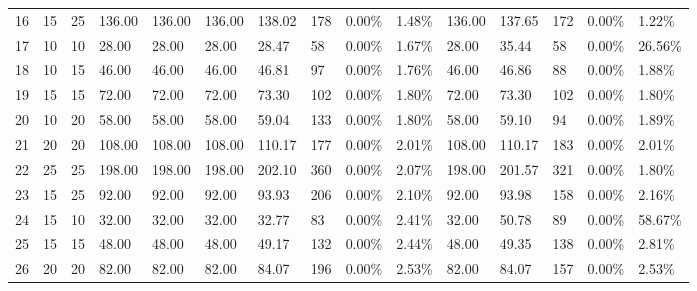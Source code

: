 \documentclass[
  a4paper,
,tablecaptionabove
]{scrartcl}
\numberwithin{equation}{section}
\begin{document}
\begin{longtable}{l|ll|ll|lllll|lllll}
  16 & 15                         & 25                         & 136.00                    & 136.00      & 136.00        & 138.02 & 178 & 0.00\%  & 1.48\% & 136.00 & 137.65 & 172 & 0.00\%  & 1.22\%  \\
  17 & 10                         & 10                         & 28.00                     & 28.00       & 28.00         & 28.47  & 58  & 0.00\%  & 1.67\% & 28.00  & 35.44  & 58  & 0.00\%  & 26.56\% \\
  18 & 10                         & 15                         & 46.00                     & 46.00       & 46.00         & 46.81  & 97  & 0.00\%  & 1.76\% & 46.00  & 46.86  & 88  & 0.00\%  & 1.88\%  \\
  19 & 15                         & 15                         & 72.00                     & 72.00       & 72.00         & 73.30  & 102 & 0.00\%  & 1.80\% & 72.00  & 73.30  & 102 & 0.00\%  & 1.80\%  \\
  20 & 10                         & 20                         & 58.00                     & 58.00       & 58.00         & 59.04  & 133 & 0.00\%  & 1.80\% & 58.00  & 59.10  & 94  & 0.00\%  & 1.89\%  \\
  21 & 20                         & 20                         & 108.00                    & 108.00      & 108.00        & 110.17 & 177 & 0.00\%  & 2.01\% & 108.00 & 110.17 & 183 & 0.00\%  & 2.01\%  \\
  22 & 25                         & 25                         & 198.00                    & 198.00      & 198.00        & 202.10 & 360 & 0.00\%  & 2.07\% & 198.00 & 201.57 & 321 & 0.00\%  & 1.80\%  \\
  23 & 15                         & 25                         & 92.00                     & 92.00       & 92.00         & 93.93  & 206 & 0.00\%  & 2.10\% & 92.00  & 93.98  & 158 & 0.00\%  & 2.16\%  \\
  24 & 15                         & 10                         & 32.00                     & 32.00       & 32.00         & 32.77  & 83  & 0.00\%  & 2.41\% & 32.00  & 50.78  & 89  & 0.00\%  & 58.67\% \\
  25 & 15                         & 15                         & 48.00                     & 48.00       & 48.00         & 49.17  & 132 & 0.00\%  & 2.44\% & 48.00  & 49.35  & 138 & 0.00\%  & 2.81\%  \\
  26 & 20                         & 20                         & 82.00                     & 82.00       & 82.00         & 84.07  & 196 & 0.00\%  & 2.53\% & 82.00  & 84.07  & 157 & 0.00\%  & 2.53\%  \\

\end{longtable}
\end{document}
